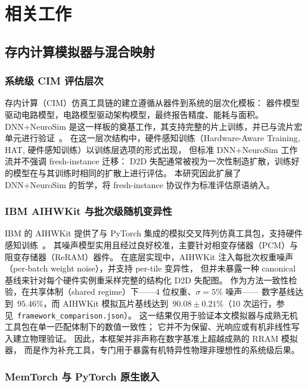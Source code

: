 \chapter{相关工作}
\label{chap:related-work}

\section{存内计算模拟器与混合映射}

\subsection{系统级 CIM 评估层次}

存内计算（CIM）仿真工具链的建立遵循从器件到系统的层次化模板：
器件模型驱动电路模型，电路模型驱动架构模型，最终报告精度、能耗与面积。
DNN+NeuroSim 是这一样板的奠基工作，其支持完整的片上训练，并已与流片宏单元进行验证~\citep{peng2020dnnneurosim}。
在这一层次结构中，硬件感知训练（Hardware-Aware Training, HAT, 硬件感知训练）以训练层选项的形式出现，
但标准 DNN+NeuroSim 工作流并不强调 fresh-instance 迁移：
D2D 失配通常被视为一次性制造扩散，训练好的模型在与其训练时相同的扩散上进行评估。
本研究因此扩展了 DNN+NeuroSim 的哲学，将 fresh-instance 协议作为标准评估原语纳入。

\subsection{IBM AIHWKit 与批次级随机变异性}

IBM 的 AIHWKit 提供了与 PyTorch 集成的模拟交叉阵列仿真工具包，支持硬件感知训练~\citep{rasch2021aihwkit}。
其噪声模型实用且经过良好校准，主要针对相变存储器（PCM）与阻变存储器（ReRAM）器件。
在底层实现中，AIHWKit 注入每批次权重噪声（per-batch weight noise），并支持 per-tile 变异性，
但并未暴露一种 canonical 基线来针对每个硬件实例重采样完整的结构化 D2D 失配图。
作为方法一致性检验，在共享体制（shared regime）下——4 位权重、$\sigma=5\%$ 噪声——
数字基线达到~$95.46\%$，而 AIHWKit 模拟瓦片基线达到~$90.08\pm0.21\%$（10 次运行，参见~\texttt{framework\_comparison.json}）。
这一结果仅用于验证本文模拟器与成熟无机工具包在单一匹配体制下的数值一致性；
它并不为保留、光响应或有机非线性写入建立物理验证。
因此，本框架并非声称在数字基准上超越成熟的 RRAM 模拟器，
而是作为补充工具，专门用于暴露有机特异性物理非理想性的系统级后果。

\subsection{MemTorch 与 PyTorch 原生嵌入}

